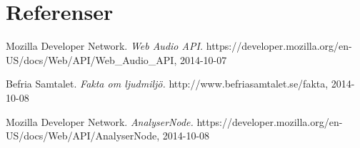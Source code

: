 \documentclass[12pt, titlepage, a4paper]{article}
\begin{document}
	\section{Referenser}
	\renewcommand{\addcontentsline}[3]{}%
  \renewcommand{\section}[2]{}%
  \begin{thebibliography}{1}

    Mozilla Developer Network.
    \emph{Web Audio API.}
    https://developer.mozilla.org/en-US/docs/Web/API/Web\_Audio\_API, 2014-10-07

    Befria Samtalet.
    \emph{Fakta om ljudmiljö.}
    http://www.befriasamtalet.se/fakta, 2014-10-08

    Mozilla Developer Network.
    \emph{AnalyserNode.}
    https://developer.mozilla.org/en-US/docs/Web/API/AnalyserNode, 2014-10-08
  \end{thebibliography}
\end{document}
